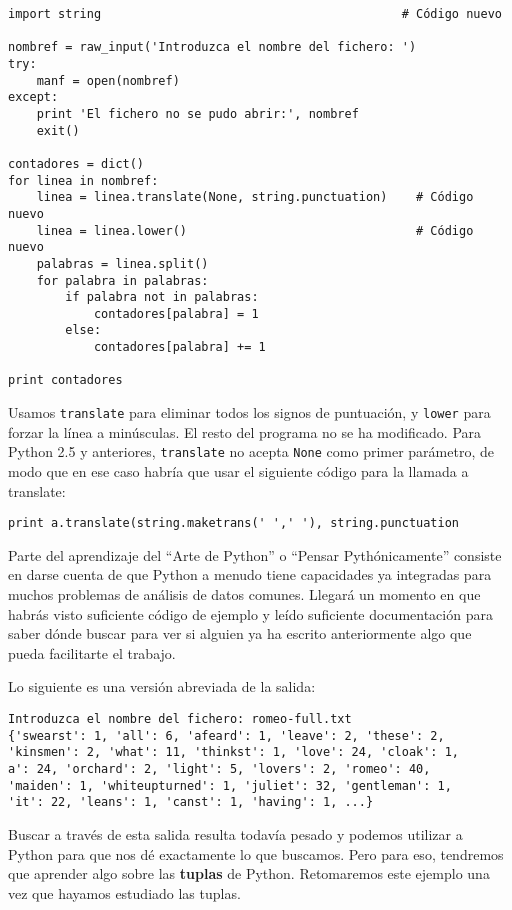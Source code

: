 \beforeverb
\begin{verbatim}
import string                                          # Código nuevo

nombref = raw_input('Introduzca el nombre del fichero: ')
try:
    manf = open(nombref)
except:
    print 'El fichero no se pudo abrir:', nombref
    exit()

contadores = dict()
for linea in nombref:
    linea = linea.translate(None, string.punctuation)    # Código nuevo
    linea = linea.lower()                                # Código nuevo
    palabras = linea.split()
    for palabra in palabras:
        if palabra not in palabras:
            contadores[palabra] = 1
        else:
            contadores[palabra] += 1

print contadores
\end{verbatim}
\afterverb
%
Usamos {\tt translate} para eliminar todos los signos de puntuación, y {\tt lower} para
forzar la línea a minúsculas. El resto del programa no se ha modificado.
Para Python 2.5 y anteriores, {\tt translate} no
acepta {\tt None} como primer parámetro, de modo que en ese caso
habría que usar el siguiente código para la llamada a translate:

\beforeverb
\begin{verbatim}
print a.translate(string.maketrans(' ',' '), string.punctuation
\end{verbatim}
\afterverb
%
Parte del aprendizaje del ``Arte de Python'' o ``Pensar Pythónicamente''
consiste en darse cuenta de que Python
a menudo tiene capacidades ya integradas para muchos problemas de análisis
de datos comunes. Llegará un momento en que habrás visto suficiente código de ejemplo y leído
suficiente documentación para saber dónde buscar para ver si alguien
ya ha escrito anteriormente algo que pueda facilitarte el trabajo.

Lo siguiente es una versión abreviada de la salida:

\beforeverb
\begin{verbatim}
Introduzca el nombre del fichero: romeo-full.txt
{'swearst': 1, 'all': 6, 'afeard': 1, 'leave': 2, 'these': 2, 
'kinsmen': 2, 'what': 11, 'thinkst': 1, 'love': 24, 'cloak': 1, 
a': 24, 'orchard': 2, 'light': 5, 'lovers': 2, 'romeo': 40, 
'maiden': 1, 'whiteupturned': 1, 'juliet': 32, 'gentleman': 1, 
'it': 22, 'leans': 1, 'canst': 1, 'having': 1, ...}
\end{verbatim}
\afterverb
%
Buscar a través de esta salida resulta todavía pesado y podemos utilizar
a \mbox{Python} para que nos dé exactamente lo que buscamos. Pero para eso,
tendremos que aprender algo sobre las {\bf tuplas} de Python.
Retomaremos este ejemplo una vez que hayamos estudiado las tuplas.

